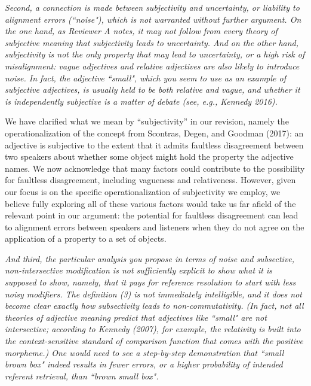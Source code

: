 \documentclass[12pt]{article}
\begin{document}
\item \emph{Second, a connection is made between subjectivity and uncertainty, or
	liability to alignment errors (``noise"), which is not warranted without
	further argument. On the one hand, as Reviewer A notes, it may not follow
	from every theory of subjective meaning that subjectivity leads to
	uncertainty. And on the other hand, subjectivity is not the only property
	that may lead to uncertainty, or a high risk of misalignment: vague
	adjectives and relative adjectives are also likely to introduce noise. In
	fact, the adjective ``small", which you seem to use as an example of
	subjective adjectives, is usually held to be both relative and vague, and
	whether it is independently subjective is a matter of debate (see, e.g.,
	Kennedy 2016).}

	We have clarified what we mean by ``subjectivity'' in our revision, namely the operationalization of the concept from Scontras, Degen, and Goodman (2017): an adjective is subjective to the extent that it admits faultless disagreement between two speakers about whether some object might hold the property the adjective names. We now acknowledge that many factors could contribute to the possibility for faultless disagreement, including vagueness and relativeness. However, given our focus is on the specific operationalization of subjectivity we employ, we believe fully exploring all of these various factors would take us far afield of the relevant point in our argument: the potential for faultless disagreement can lead to alignment errors between speakers and listeners when they do not agree on the application of a property to a set of objects.
	
\item \emph{And third, the particular analysis you propose in terms of noise and
	subsective, non-intersective modification is not sufficiently explicit to
	show what it is supposed to show, namely, that it pays for reference
	resolution to start with less noisy modifiers. The definition (3) is not
	immediately intelligible, and it does not become clear exactly how
	subsectivity leads to non-commutativity. (In fact, not all theories of
	adjective meaning predict that adjectives like ``small" are not intersective;
	according to Kennedy (2007), for example, the relativity is built into the
	context-sensitive standard of comparison function that comes with the
	positive morpheme.) One would need to see a step-by-step demonstration that
	``small brown box" indeed results in fewer errors, or a higher probability of
	intended referent retrieval, than ``brown small box".}
\end{document}
